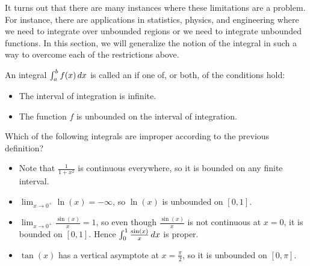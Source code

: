 \documentclass{ximera}
\begin{document}
It turns out that there are many instances where these limitations are a problem.  For instance, there are applications in statistics, physics, and engineering where we need to integrate over unbounded regions or we need to integrate unbounded functions.  In this section, we will generalize the notion of the integral in such a way to overcome each of the restrictions above.



\begin{definition}
  An integral $\int_a^b f(x) \mathop{}\!d x $
  is called an  if one of, or both, of the conditions hold:
  \begin{itemize}
  \item The interval of integration is infinite.
  \item The function $f$ is unbounded on the interval of integration.
  \end{itemize}
\end{definition}

\begin{question}
  Which of the following integrals are improper according to the previous definition?
  \begin{selectAll}
  \end{selectAll}

\begin{feedback}
\begin{itemize}
\item Note that $\frac{1}{1+x^2}$ is continuous everywhere, so it is bounded on any finite interval. 
\item $\lim_{x \to 0^+} \ln(x) = -\infty$, so $\ln(x)$ is unbounded on $[0,1]$.
\item $\lim_{x \to 0^+} \frac{\sin(x)}{x} = 1$, so even though $\frac{\sin(x)}{x}$ is not continuous at $x=0$, it is bounded on $[0,1]$.  Hence $\int_0^1 \frac{\sin(x)}{x} \mathop{}\!d x$ is proper.
\item $\tan(x)$ has a vertical asymptote at $x=\frac{\pi}{2}$, so it is unbounded on $[0,\pi]$.
\end{itemize}
\end{feedback}
\end{question}
\end{document}
